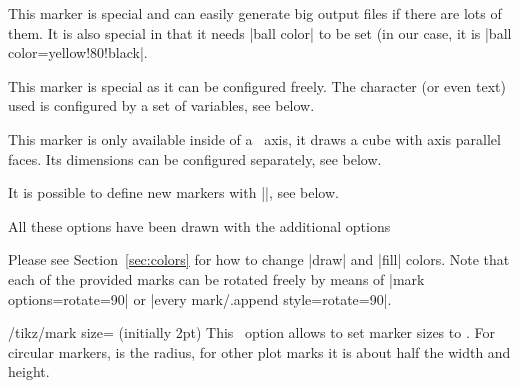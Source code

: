\begin{longdescription}
		This marker is special and can easily generate big output files if there are lots of them. It is also special in that it needs |ball color| to be set (in our case, it is |ball color=yellow!80!black|.

	\item[mark=text]  

	This marker is special as it can be configured freely. The character (or even text) used is configured by a set of variables, see below.
	\item[mark=cube] 
	
	This marker is only available inside of a \PGFPlots\ axis, it draws a cube with axis parallel faces. Its dimensions can be configured separately, see below.
	\item[mark=cube*] 

	\item[User defined] It is possible to define new markers with |\pgfdeclareplotmark|, see below.
\end{longdescription}
All these options have been drawn with the additional options
\begin{codeexample}
\draw[
	gray,
	thin,
	mark options={%
		scale=2,fill=yellow!80!black,draw=black
	}
]
\end{codeexample}
Please see Section~\ref{sec:colors} for how to change |draw| and |fill| colors.
Note that each of the provided marks can be rotated freely by means of |mark options={rotate=90}| or |every mark/.append style={rotate=90}|.

\begin{key}{/tikz/mark size= (initially 2pt)}
	This \Tikz\ option allows to set marker sizes to . For circular markers,  is the radius, for other plot marks it is about half the width and height.
\end{key}

